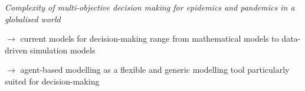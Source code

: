{%

\bigskip

\textit{Complexity of multi-objective decision making for epidemics and pandemics in a globalised world \cite{saker2004globalization} \cite{bickley2021does}}

\bigskip
\bigskip
\bigskip

$\rightarrow$ current models for decision-making range from mathematical models \cite{brauer2008compartmental} to data-driven simulation models \cite{buczak2012data}

\bigskip

$\rightarrow$ agent-based modelling as a flexible and generic modelling tool particularly suited for decision-making \cite{miksch2019should} \cite{minoza2021covid}


}



